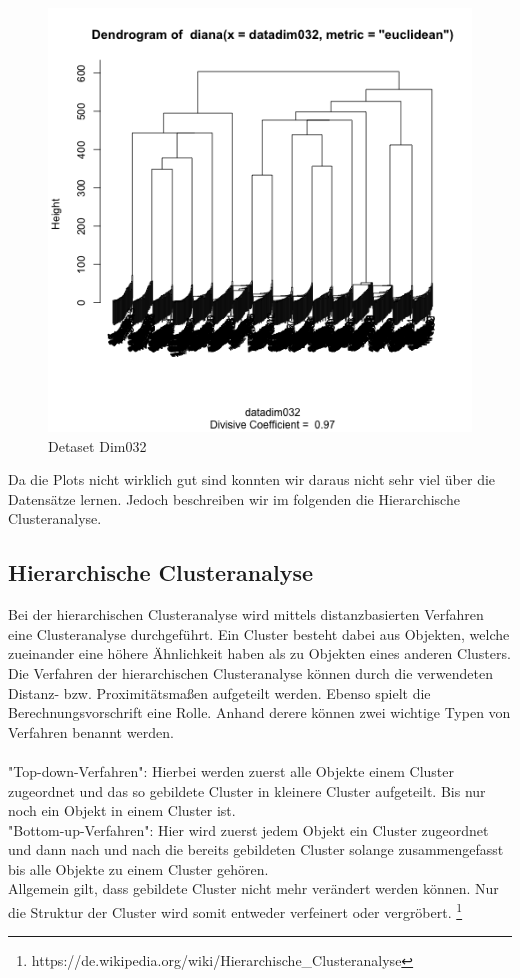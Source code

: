\documentclass{article}
\begin{document}
\begin{figure}[ht!]
\caption{Detaset Dim032}
\centering
\includegraphics[width=1\textwidth]{plots/dv2dim032.png}
\end{figure}

Da die Plots nicht wirklich gut sind konnten wir daraus nicht sehr viel über die Datensätze lernen. Jedoch beschreiben wir im folgenden die Hierarchische Clusteranalyse.

\subsection{Hierarchische Clusteranalyse}
Bei der hierarchischen Clusteranalyse wird mittels distanzbasierten Verfahren eine Clusteranalyse durchgeführt. Ein Cluster besteht dabei aus Objekten, welche zueinander eine höhere Ähnlichkeit haben als zu Objekten eines anderen Clusters. \\
Die Verfahren der hierarchischen Clusteranalyse können durch die verwendeten Distanz- bzw. Proximitätsmaßen aufgeteilt werden. Ebenso spielt die Berechnungsvorschrift eine Rolle. Anhand derere können zwei wichtige Typen von Verfahren benannt werden. \\
\\
"Top-down-Verfahren": Hierbei werden zuerst alle Objekte einem Cluster zugeordnet und das so gebildete Cluster in kleinere Cluster aufgeteilt. Bis nur noch ein Objekt in einem Cluster ist.
\\
"Bottom-up-Verfahren": Hier wird zuerst jedem Objekt ein Cluster zugeordnet und dann nach und nach die bereits gebildeten Cluster solange zusammengefasst bis alle Objekte zu einem Cluster gehören. 
\\
Allgemein gilt, dass gebildete Cluster nicht mehr verändert werden können. Nur die Struktur der Cluster wird somit entweder verfeinert oder vergröbert. \footnote{https://de.wikipedia.org/wiki/Hierarchische\_Clusteranalyse}
\end{document}
